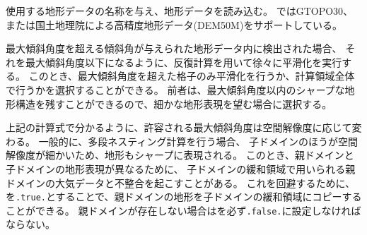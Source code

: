使用する地形データの名称を与え、地形データを読み込む。
\scalerm ではGTOPO30、または国土地理院による高精度地形データ(DEM50M)をサポートしている。

最大傾斜角度を超える傾斜角が与えられた地形データ内に検出された場合、
それを最大傾斜角度以下になるように、反復計算を用いて徐々に平滑化を実行する。
このとき、最大傾斜角度を超えた格子のみ平滑化を行うか、計算領域全体で行うかを選択することができる。
前者は、最大傾斜角度以内のシャープな地形構造を残すことができるので、細かな地形表現を望む場合に選択する。

上記の計算式で分かるように、許容される最大傾斜角度は空間解像度に応じて変わる。
一般的に、多段ネスティング計算を行う場合、
子ドメインのほうが空間解像度が細かいため、地形もシャープに表現される。
このとき、親ドメインと子ドメインの地形表現が異なるために、
子ドメインの緩和領域で用いられる親ドメインの大気データと不整合を起こすことがある。
これを回避するために、
を\verb|.true.|とすることで、親ドメインの地形を子ドメインの緩和領域にコピーすることができる。
親ドメインが存在しない場合はを必ず\verb|.false.|に設定しなければならない。
